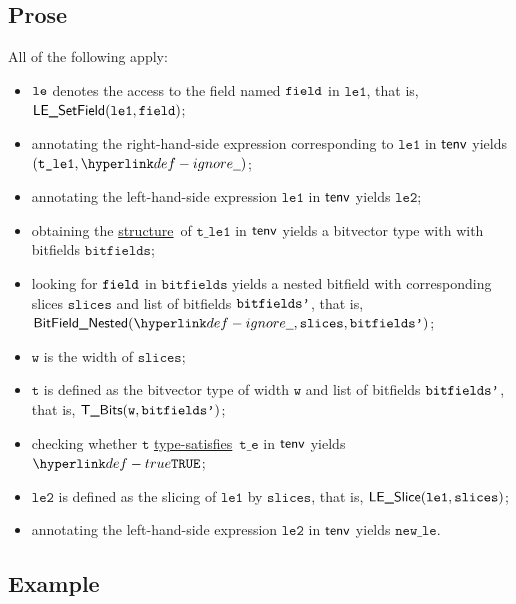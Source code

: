 \documentclass{book}
\newcommand\ProseOrTypeError[0]{\ProseTerminateAs{\TypeErrorConfig}}
\newcommand\structure[0]{\hyperlink{def-structure}{structure}}
\newcommand\typesatisfies[0]{\hyperlink{def-typesatisfies}{type-satisfies}}
\newcommand\vt[0]{\texttt{t}}
\newcommand\vte[0]{\texttt{t\_e}}
\newcommand\vleone[0]{\texttt{le1}}
\newcommand\vletwo[0]{\texttt{le2}}
\newcommand\vtleone[0]{\texttt{t\_le1}}
\newcommand\vw[0]{\texttt{w}}
\newcommand\bitfields[0]{\texttt{bitfields}}
\newcommand\newle[0]{\texttt{new\_le}}
\newcommand\slices[0]{\texttt{slices}}
\begin{document}
\subsection{Prose}
All of the following apply:
\begin{itemize}
\item $\texttt{le}$ denotes the access to the field named $\texttt{field}$ in $\vleone$, that is, \\ $\LESetField(\vleone, \field)$;
\item annotating the right-hand-side expression corresponding to $\vleone$ in $\textsf{tenv}$ yields \\ $(\vtleone, \Ignore)$\ProseOrTypeError;
\item annotating the left-hand-side expression $\vleone$ in $\textsf{tenv}$ yields $\vletwo$\ProseOrTypeError;
\item obtaining the \structure\ of $\vtleone$ in $\textsf{tenv}$ yields a bitvector type with with bitfields $\bitfields$\ProseOrTypeError;
\item looking for $\texttt{field}$ in $\bitfields$ yields a nested bitfield with corresponding slices $\slices$ and list of bitfields
      $\texttt{bitfields'}$, that is, \\ $\BitFieldNested(\Ignore, \slices, \bitfieldsp)$;
\item $\vw$ is the width of $\slices$;
\item $\vt$ is defined as the bitvector type of width $\vw$ and list of bitfields $\texttt{bitfields'}$, that is, $\TBits(\vw, \bitfieldsp)$;
\item checking whether $\vt$ \typesatisfies\ $\vte$ in $\textsf{tenv}$ yields $\True$\ProseOrTypeError;
\item $\vletwo$ is defined as the slicing of $\vleone$ by $\slices$, that is, $\LESlice(\vleone, \slices)$;
\item annotating the left-hand-side expression $\vletwo$ in $\textsf{tenv}$ yields $\newle$\ProseOrTypeError.
\end{itemize}

\subsection{Example}

\end{document}
